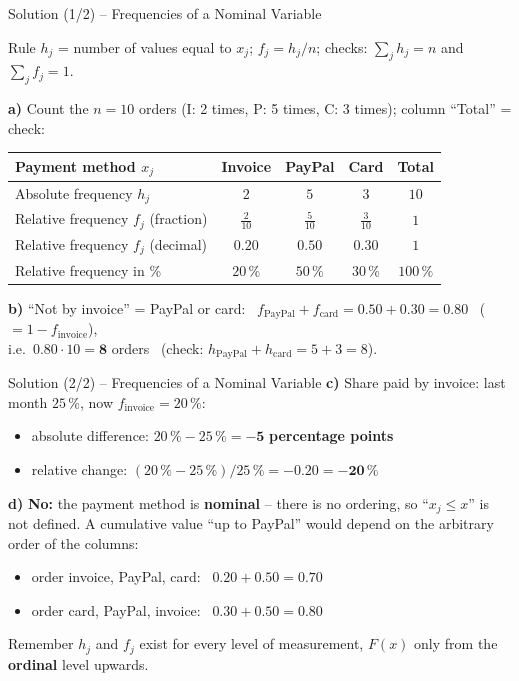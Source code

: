 \documentclass[aspectratio=169,11pt]{beamer}
\begin{document}
\begin{frame}{Solution (1/2) -- Frequencies of a Nominal Variable}
  \begin{block}{Rule}
    $h_j$ = number of values equal to $x_j$; \quad $f_j = h_j / n$; \quad
    checks: $\sum_j h_j = n$ and $\sum_j f_j = 1$.
  \end{block}
  \textbf{a)} Count the $n = 10$ orders (I: 2 times, P: 5 times, C: 3 times); column ``Total'' = check:
  \begin{center}
    \renewcommand{\arraystretch}{1.15}
    \begin{tabular}{lcccc}
      \toprule
      Payment method $x_j$ & Invoice & PayPal & Card & Total \\
      \midrule
      Absolute frequency $h_j$ & $2$ & $5$ & $3$ & $10$ \\
      Relative frequency $f_j$ (fraction) & $\tfrac{2}{10}$ & $\tfrac{5}{10}$ & $\tfrac{3}{10}$ & $1$ \\
      Relative frequency $f_j$ (decimal) & $\mathbf{0.20}$ & $\mathbf{0.50}$ & $\mathbf{0.30}$ & $1$ \\
      Relative frequency in \% & $20\,\%$ & $50\,\%$ & $30\,\%$ & $100\,\%$ \\
      \bottomrule
    \end{tabular}
  \end{center}

  \textbf{b)} ``Not by invoice'' = PayPal or card: \
  $f_{\text{PayPal}} + f_{\text{card}} = 0.50 + 0.30 = \mathbf{0.80}$ \ ($= 1 - f_{\text{invoice}}$),\\
  \hspace*{1.2em}i.e.\ $0.80 \cdot 10 = \mathbf{8}$ orders \ (check: $h_{\text{PayPal}} + h_{\text{card}} = 5 + 3 = 8$).
\end{frame}

\begin{frame}{Solution (2/2) -- Frequencies of a Nominal Variable}
  \textbf{c)} Share paid by invoice: last month $25\,\%$, now $f_{\text{invoice}} = 20\,\%$:
  \begin{itemize}
    \item absolute difference: $20\,\% - 25\,\% = \mathbf{-5}$ \textbf{percentage points}
    \item relative change: $(20\,\% - 25\,\%) / 25\,\% = -0.20 = \mathbf{-20\,\%}$
  \end{itemize}

  \medskip
  \textbf{d)} \textbf{No:} the payment method is \textbf{nominal} -- there is no ordering, so
  ``$x_j \leq x$'' is not defined. A cumulative value ``up to PayPal'' would depend on the
  arbitrary order of the columns:
  \begin{itemize}
    \item order invoice, PayPal, card: \ $0.20 + 0.50 = 0.70$
    \item order card, PayPal, invoice: \ $0.30 + 0.50 = 0.80$
  \end{itemize}
  \begin{alertblock}{Remember}
    $h_j$ and $f_j$ exist for every level of measurement, $F(x)$ only from the
    \textbf{ordinal} level upwards.
  \end{alertblock}
\end{frame}
\end{document}
